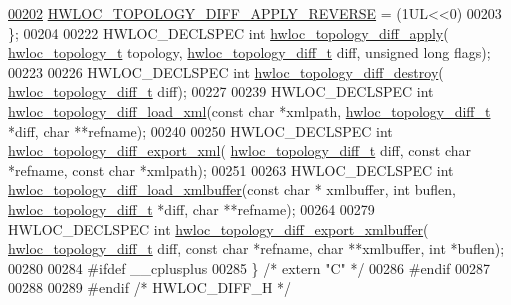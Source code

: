 \begin{DoxyCode}
\hyperlink{a00225_ggada4c1273ce020afaf02b649496f7edf5a821a160512d67ea0dd05dab873d2fc54}{00202}   \hyperlink{a00225_ggada4c1273ce020afaf02b649496f7edf5a821a160512d67ea0dd05dab873d2fc54}{HWLOC\_TOPOLOGY\_DIFF\_APPLY\_REVERSE} = (1UL<<0)
00203 \};
00204 
00222 HWLOC\_DECLSPEC \textcolor{keywordtype}{int} \hyperlink{a00225_gae7b350d7e7478a4c6047b08aa6544f40}{hwloc\_topology\_diff\_apply}(
      \hyperlink{a00186_ga9d1e76ee15a7dee158b786c30b6a6e38}{hwloc\_topology\_t} topology, \hyperlink{a00350}{hwloc\_topology\_diff\_t} diff, \textcolor{keywordtype}{unsigned} \textcolor{keywordtype}{long} 
      flags);
00223 
00226 HWLOC\_DECLSPEC \textcolor{keywordtype}{int} \hyperlink{a00225_ga5dcff18f80583ac6505a94ba2877fd1b}{hwloc\_topology\_diff\_destroy}(
      \hyperlink{a00350}{hwloc\_topology\_diff\_t} diff);
00227 
00239 HWLOC\_DECLSPEC \textcolor{keywordtype}{int} \hyperlink{a00225_ga2cd902ce8766e90d4f2523a8e87640e9}{hwloc\_topology\_diff\_load\_xml}(\textcolor{keyword}{const} \textcolor{keywordtype}{char} *xmlpath, 
      \hyperlink{a00350}{hwloc\_topology\_diff\_t} *diff, \textcolor{keywordtype}{char} **refname);
00240 
00250 HWLOC\_DECLSPEC \textcolor{keywordtype}{int} \hyperlink{a00225_ga8a14dd7d01efbdd97af7fe85e8b84b20}{hwloc\_topology\_diff\_export\_xml}(
      \hyperlink{a00350}{hwloc\_topology\_diff\_t} diff, \textcolor{keyword}{const} \textcolor{keywordtype}{char} *refname, \textcolor{keyword}{const} \textcolor{keywordtype}{char} *xmlpath);
00251 
00263 HWLOC\_DECLSPEC \textcolor{keywordtype}{int} \hyperlink{a00225_gad693810a5c51628529b9dd56f040fb81}{hwloc\_topology\_diff\_load\_xmlbuffer}(\textcolor{keyword}{const} \textcolor{keywordtype}{char} *
      xmlbuffer, \textcolor{keywordtype}{int} buflen, \hyperlink{a00350}{hwloc\_topology\_diff\_t} *diff, \textcolor{keywordtype}{char} **refname);
00264 
00279 HWLOC\_DECLSPEC \textcolor{keywordtype}{int} \hyperlink{a00225_gaa2f0918df60c1c4a0bef9411f7d92a13}{hwloc\_topology\_diff\_export\_xmlbuffer}(
      \hyperlink{a00350}{hwloc\_topology\_diff\_t} diff, \textcolor{keyword}{const} \textcolor{keywordtype}{char} *refname, \textcolor{keywordtype}{char} **xmlbuffer, \textcolor{keywordtype}{int} *buflen);
00280 
00284 \textcolor{preprocessor}{#ifdef \_\_cplusplus}
00285 \} \textcolor{comment}{/* extern "C" */}
00286 \textcolor{preprocessor}{#endif}
00287 
00288 
00289 \textcolor{preprocessor}{#endif }\textcolor{comment}{/* HWLOC\_DIFF\_H */}\textcolor{preprocessor}{}
\end{DoxyCode}

